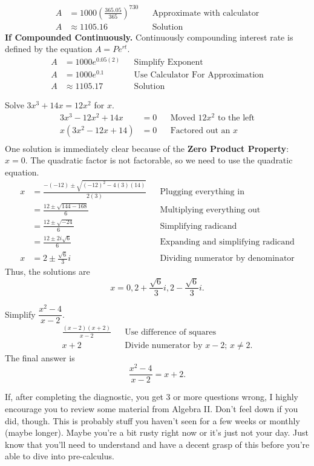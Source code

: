\begin{solution}[title=Solution 5]
\begin{align*}
        A &= 1000\left(\frac{365.05}{365}\right)^{730} &&
        \text{Approximate with calculator} \\
        A &\approx 1105.16 && \text{Solution}
    \end{align*}
    \textbf{If Compounded Continuously.} Continuously compounding interest rate is defined by the equation $A = Pe^{rt}$.
    \begin{align*}
        A &= 1000e^{0.05(2)} && \text{Simplify Exponent} \\
        A &= 1000e^{0.1} && \text{Use Calculator For Approximation} \\
        A &\approx 1105.17 && \text{Solution}
    \end{align*}
\end{solution}
\clearpage
\begin{solution}[title=Solution 6]
    Solve $3x^3 + 14x = 12x^2$ for $x$.
    \begin{align*}
        3x^3 - 12x^2 + 14x &= 0 && \text{Moved $12x^2$ to the left} \\
        x(3x^2 - 12x + 14) &= 0 && \text{Factored out an $x$} \\
    \end{align*}
    One solution is immediately clear because of the \textbf{Zero Product Property}: $x = 0$. The quadratic factor is not factorable, so we need to use the quadratic equation.
    \begin{align*}
        x &= \frac{-(-12) \pm \sqrt{(-12)^2 - 4(3)(14)}}{2(3)}
        && \text{Plugging everything in} \\
        &= \frac{12 \pm \sqrt{144 - 168}}{6} &&
        \text{Multiplying everything out}\\
        &= \frac{12 \pm \sqrt{-24}}{6} &&
        \text{Simplifying radicand}\\
        &= \frac{12 \pm 2i\sqrt{6}}{6} &&
        \text{Expanding and simplifying radicand}\\
        x &= 2 \pm \frac{\sqrt{6}}{3}i && \text{Dividing numerator by denominator}
    \end{align*}
    Thus, the solutions are
    \[
    \boxed{x = 0, 2 + \frac{\sqrt{6}}{3}i, 2 - \frac{\sqrt{6}}{3}i} \text{.}
    \]
\end{solution}
\clearpage
\begin{solution}[title=Solution 7]
    Simplify $\dfrac{x^2 - 4}{x - 2}$.
    \begin{align*}
        \frac{(x - 2)(x + 2)}{x - 2} && \text{Use difference of squares} \\
        x + 2 && \text{Divide numerator by $x - 2$; $x\neq 2$.}
    \end{align*}
    The final answer is
    \[
    \boxed{\frac{x^2 - 4}{x - 2} = x + 2} \text{.}
    \]
\end{solution}
If, after completing the diagnostic, you get 3 or more questions wrong, I highly encourage you to review some material from Algebra II. Don't feel down if you did, though. This is probably stuff you haven't seen for a few weeks or monthly (maybe longer). Maybe you're a bit rusty right now or it's just not your day. Just know that you'll need to understand and have a decent grasp of this before you're able to dive into pre-calculus.